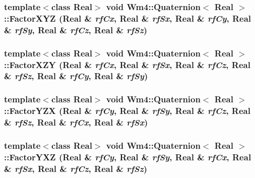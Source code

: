 \subsubsection{\setlength{\rightskip}{0pt plus 5cm}template$<$class Real$>$ void {\bf Wm4::Quaternion}$<$ Real $>$::Factor\-XYZ (Real \& {\em rf\-Cx}, Real \& {\em rf\-Sx}, Real \& {\em rf\-Cy}, Real \& {\em rf\-Sy}, Real \& {\em rf\-Cz}, Real \& {\em rf\-Sz})}\label{classWm4_1_1Quaternion_420d3321c0d496f3f4a3b31ebd68f0d8}


\subsubsection{\setlength{\rightskip}{0pt plus 5cm}template$<$class Real$>$ void {\bf Wm4::Quaternion}$<$ Real $>$::Factor\-XZY (Real \& {\em rf\-Cx}, Real \& {\em rf\-Sx}, Real \& {\em rf\-Cz}, Real \& {\em rf\-Sz}, Real \& {\em rf\-Cy}, Real \& {\em rf\-Sy})}\label{classWm4_1_1Quaternion_1da1524e67dfadadd3d73796e124a741}


\subsubsection{\setlength{\rightskip}{0pt plus 5cm}template$<$class Real$>$ void {\bf Wm4::Quaternion}$<$ Real $>$::Factor\-YZX (Real \& {\em rf\-Cy}, Real \& {\em rf\-Sy}, Real \& {\em rf\-Cz}, Real \& {\em rf\-Sz}, Real \& {\em rf\-Cx}, Real \& {\em rf\-Sx})}\label{classWm4_1_1Quaternion_91edb7b79dc41cec01bd8c7cf6ba147f}


\subsubsection{\setlength{\rightskip}{0pt plus 5cm}template$<$class Real$>$ void {\bf Wm4::Quaternion}$<$ Real $>$::Factor\-YXZ (Real \& {\em rf\-Cy}, Real \& {\em rf\-Sy}, Real \& {\em rf\-Cx}, Real \& {\em rf\-Sx}, Real \& {\em rf\-Cz}, Real \& {\em rf\-Sz})}\label{classWm4_1_1Quaternion_4a3e790021f7eff98183820a6f573fc3}


